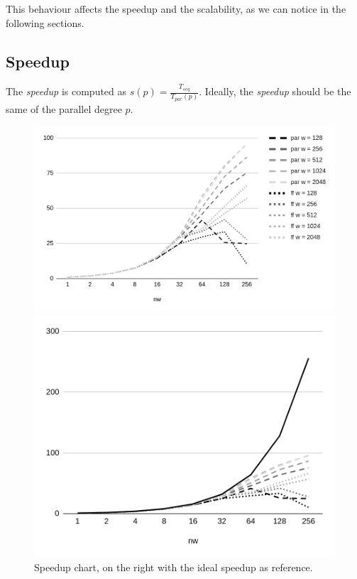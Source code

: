 This behaviour affects the speedup and the scalability, as we can notice in the following sections.



\subsection{Speedup}
The \textit{speedup} is computed as $s(p) = \frac{T_{seq}}{T_{par}(p)}$. Ideally, the \textit{speedup} should be the same of the parallel degree $p$.

\begin{figure}[H]
    \centering
    \begin{minipage}{.68\linewidth}
        \includegraphics[width=\linewidth]{assets/speedup}
    \end{minipage}
    \begin{minipage}{.3\linewidth}
        \includegraphics[width=\linewidth]{assets/speedup_ideal}
    \end{minipage}
    \caption{Speedup chart, on the right with the ideal speedup as reference.}
    \label{fig:speedup}
\end{figure}

